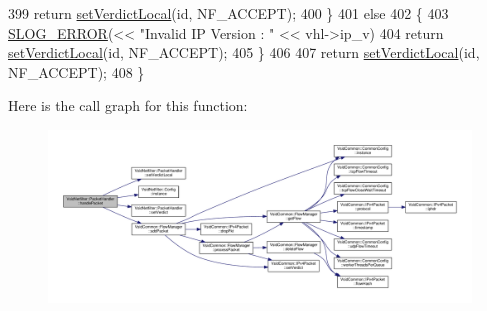 \begin{DoxyCode}
399         return \hyperlink{class_vsid_netfilter_1_1_packet_handler_a579cb580e2801acc62e56336b59242c4}{setVerdictLocal}(\textcolor{keywordtype}{id}, NF\_ACCEPT);
400     \}
401     else
402     \{
403         \hyperlink{_logger_8h_a2a8694cd392d18f4db6b9cc9f15bafe3}{SLOG\_ERROR}(<< \textcolor{stringliteral}{"Invalid IP Version : "} << vhl->ip\_v)
404         return \hyperlink{class_vsid_netfilter_1_1_packet_handler_a579cb580e2801acc62e56336b59242c4}{setVerdictLocal}(\textcolor{keywordtype}{id}, NF\_ACCEPT);
405     \}
406 
407     return \hyperlink{class_vsid_netfilter_1_1_packet_handler_a579cb580e2801acc62e56336b59242c4}{setVerdictLocal}(\textcolor{keywordtype}{id}, NF\_ACCEPT);
408 \}
\end{DoxyCode}


Here is the call graph for this function\-:
\nopagebreak
\begin{figure}[H]
\begin{center}
\leavevmode
\includegraphics[width=350pt]{class_vsid_netfilter_1_1_packet_handler_a348aa5a48468fd46ec5ecff507d51e24_cgraph}
\end{center}
\end{figure}



